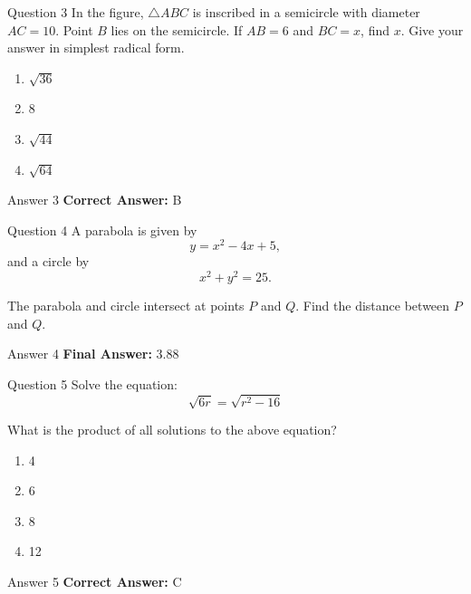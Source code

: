 \documentclass{beamer}
\begin{document}
\begin{frame}{Question 3}
\small
In the figure, \(\triangle ABC\) is inscribed in a semicircle with diameter \(AC = 10\). Point \(B\) lies on the semicircle. If \(AB = 6\) and \(BC = x\), find \(x\). Give your answer in simplest radical form.
\vspace{0.35cm}
\begin{enumerate}
    \item[A.] \(\sqrt{36}\)
    \item[B.] 8
    \item[C.] \(\sqrt{44}\)
    \item[D.] \(\sqrt{64}\)
\end{enumerate}
\end{frame}
\begin{frame}{Answer 3}
\small
\textbf{Correct Answer:} B
\end{frame}

\begin{frame}{Question 4}
\small
A parabola is given by
\[
y = x^2 - 4x + 5,
\]
and a circle by
\[
x^2 + y^2 = 25.
\]

The parabola and circle intersect at points \(P\) and \(Q\). Find the distance between \(P\) and \(Q\).
\end{frame}
\begin{frame}{Answer 4}
\small
\textbf{Final Answer:} $\boxed{3.88}$
\end{frame}

\begin{frame}{Question 5}
\small
Solve the equation:
\[
\sqrt{6r} = \sqrt{r^2 - 16}
\]

What is the product of all solutions to the above equation?
\vspace{0.35cm}
\begin{enumerate}
    \item[A.] 4
    \item[B.] 6
    \item[C.] 8
    \item[D.] 12
\end{enumerate}
\end{frame}
\begin{frame}{Answer 5}
\small
\textbf{Correct Answer:} C
\end{frame}
\end{document}
